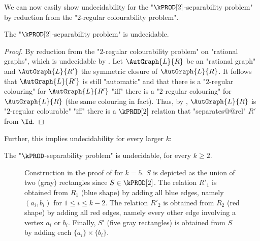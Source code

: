 We can now easily show undecidability for the "$\kPROD[2]$-separability problem" by reduction from the "$2$-regular colourability problem".
\begin{lemma}\AP\label{lem:aut-2prod-sep-undec}
    The "$\kPROD[2]$-separability problem" is undecidable.
\end{lemma}
\begin{proof}
    By reduction from the "$2$-regular colourability problem" on "rational graphs", which is undecidable by . Let $\AutGraph{L}{R}$ be an "rational graph" and $\AutGraph{L}{R'}$ the symmetric closure of $\AutGraph{L}{R}$. It follows that $\AutGraph{L}{R'}$ is still "automatic" and that there is a "$2$-regular colouring" for $\AutGraph{L}{R'}$ "iff" there is a "$2$-regular colouring" for $\AutGraph{L}{R}$ (the same colouring in fact).
    Thus, by , $\AutGraph{L}{R}$ is "$2$-regular colourable" "iff" 
    there is a $\kPROD[2]$ relation that "separates@@rel" $R'$ from $\Id$.
\end{proof}

Further, this implies undecidability for every larger $k$:
\begin{theorem}
    \AP\label{thm:kprod-undecidable}
    The "$\kPROD$-separability problem" is undecidable, for every $k \geq 2$.
\end{theorem}

\begin{figure}
    \centering
    \begin{tikzpicture}
        
    \end{tikzpicture}
    \caption{
        \AP\label{fig:2prod-to-kprod}
        Construction in the proof of  for $k = 5$. $S$ is depicted as the union of two (gray) rectangles since $S \in \kPROD[2]$.
        The relation $R'_1$ is obtained from $R_1$ (blue shape) by adding all blue edges,
        namely $(a_i, b_i)$ for $1\leq i \leq k-2$. The relation $R'_2$ is obtained from $R_2$ (red shape) by adding
        all red edges, namely every other edge involving a vertex $a_i$ or $b_i$.
        Finally, $S'$ (five gray rectangles) is obtained from $S$ by adding
        each $\{a_i\} \times \{b_i\}$.
    }
\end{figure}

